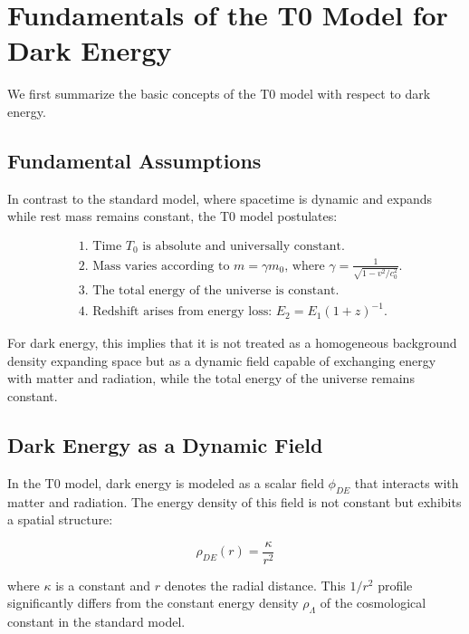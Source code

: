 \documentclass[a4paper,12pt]{article}
\begin{document}
\section{Fundamentals of the T0 Model for Dark Energy}

We first summarize the basic concepts of the T0 model with respect to dark energy.

\subsection{Fundamental Assumptions}

In contrast to the standard model, where spacetime is dynamic and expands while rest mass remains constant, the T0 model postulates:

\begin{tcolorbox}[colback=blue!5!white,colframe=blue!75!black,title=Fundamental Assumptions of the T0 Model]
	\begin{align}
		&\text{1. Time $T_0$ is absolute and universally constant.} \\
		&\text{2. Mass varies according to $m = \gamma m_0$, where $\gamma = \frac{1}{\sqrt{1-v^2/c_0^2}}$.} \\
		&\text{3. The total energy of the universe is constant.} \\
		&\text{4. Redshift arises from energy loss: $E_2 = E_1(1+z)^{-1}$.}
	\end{align}
\end{tcolorbox}

For dark energy, this implies that it is not treated as a homogeneous background density expanding space but as a dynamic field capable of exchanging energy with matter and radiation, while the total energy of the universe remains constant.

\subsection{Dark Energy as a Dynamic Field}

In the T0 model, dark energy is modeled as a scalar field $\phi_{DE}$ that interacts with matter and radiation. The energy density of this field is not constant but exhibits a spatial structure:

\begin{equation}
	\rho_{DE}(r) = \frac{\kappa}{r^2}
\end{equation}

where $\kappa$ is a constant and $r$ denotes the radial distance. This $1/r^2$ profile significantly differs from the constant energy density $\rho_\Lambda$ of the cosmological constant in the standard model.
\end{document}
